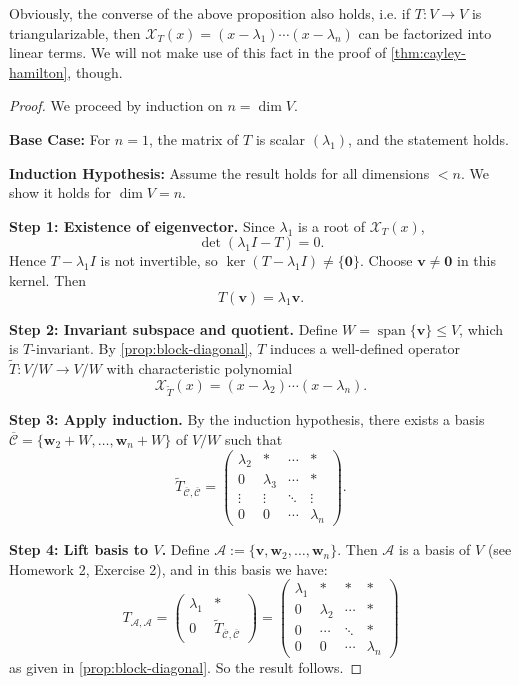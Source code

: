 Obviously, the converse of the above proposition also holds, i.e. if $T:V \to V$ is triangularizable, then $\mathcal{X}_T(x) = (x - \lambda_1) \cdots (x - \lambda_n)$ can be factorized into linear terms. We will not make use of this fact in the proof of \autoref{thm:cayley-hamilton}, though.
\begin{proof}
We proceed by induction on \( n = \dim V \).

\textbf{Base Case:} For \( n = 1 \), the matrix of \( T \) is scalar \( (\lambda_1) \), and the statement holds.

\textbf{Induction Hypothesis:} Assume the result holds for all dimensions \( < n \). We show it holds for \( \dim V = n \).

\textbf{Step 1: Existence of eigenvector.}
Since \(\lambda_1\) is a root of \(\mathcal{X}_T(x)\),
\[
\det(\lambda_1 I-T)=0.
\]
Hence \(T-\lambda_1 I\) is not invertible, so \(\ker(T-\lambda_1 I)\neq\{\mathbf{0}\}\). Choose \(\mathbf{v}\neq\mathbf{0}\) in this kernel. Then
\[
T(\mathbf{v})=\lambda_1\mathbf{v}.
\]

\textbf{Step 2: Invariant subspace and quotient.}
Define \( W = \operatorname{span}\{\mathbf{v}\} \leq V \), which is \( T \)-invariant. By \autoref{prop:block-diagonal}, \( T \) induces a well-defined operator \( \widetilde{T} : V/W \to V/W \) with characteristic polynomial
\[
\mathcal{X}_{\widetilde{T}}(x) = (x - \lambda_2) \cdots (x - \lambda_n).
\]

\textbf{Step 3: Apply induction.}
By the induction hypothesis, there exists a basis \( \overline{\mathcal{C}} = \{ \mathbf{w}_2 + W, \dots, \mathbf{w}_n + W \} \) of \( V/W \) such that
\[
\widetilde{T}_{\overline{\mathcal{C}}, \overline{\mathcal{C}}} =
\begin{pmatrix}
\lambda_2 & * & \cdots & * \\
0 & \lambda_3 & \cdots & * \\
\vdots & \vdots & \ddots & \vdots \\
0 & 0 & \cdots & \lambda_n
\end{pmatrix}.
\]

\textbf{Step 4: Lift basis to \( V \).}
Define \( \mathcal{A} := \{ \mathbf{v}, \mathbf{w}_2, \dots, \mathbf{w}_n \} \). Then \( \mathcal{A} \) is a basis of \( V \) (see Homework 2, Exercise 2), and in this basis we have:
\[
T_{\mathcal{A}, \mathcal{A}} =
\begin{pmatrix}
\lambda_1 & * \\
0 & \widetilde{T}_{\overline{\mathcal{C}}, \overline{\mathcal{C}}}
\end{pmatrix}
=
\begin{pmatrix}
\lambda_1 & * & * & * \\
0 & \lambda_2 & \cdots & * \\
0 & \cdots & \ddots & * \\
0 & 0 & \cdots & \lambda_n
\end{pmatrix}
\]
as given in \autoref{prop:block-diagonal}. So the result follows.
\end{proof}
